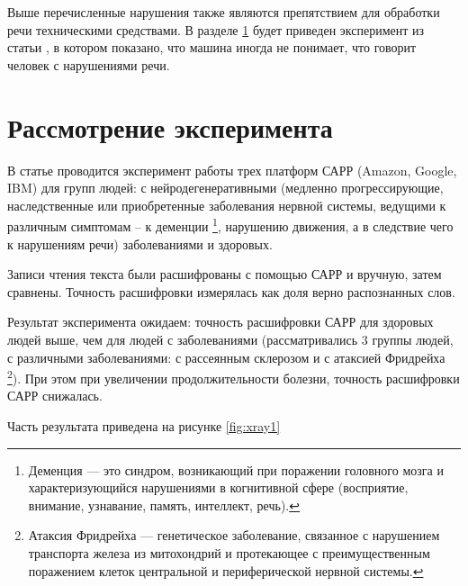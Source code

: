 Выше перечисленные нарушения также являются препятствием для обработки речи техническими средствами. В разделе \ref{5000} будет приведен эксперимент из статьи \cite{primer}, в котором показано, что машина иногда не понимает, что говорит человек с нарушениями речи.


\section{Рассмотрение эксперимента} \label{5000}
В статье \cite{primer} проводится эксперимент работы трех платформ САРР \newline(Amazon, Google, IBM) для групп людей: с нейродегенеративными (медленно прогрессирующие, наследственные или приобретенные заболевания нервной системы, ведущими к различным симптомам -- к деменции \footnote{Деменция — это синдром, возникающий при поражении головного мозга и характеризующийся нарушениями в когнитивной сфере (восприятие, внимание, узнавание, память, интеллект, речь).}, нарушению движения, а в следствие чего к нарушениям речи) заболеваниями и здоровых.

Записи чтения текста были расшифрованы с помощью САРР и вручную, затем сравнены. Точность расшифровки измерялась как доля верно распознанных слов. 

Результат эксперимента ожидаем: точность расшифровки САРР для здоровых людей выше, чем для людей с заболеваниями (рассматривались 3 группы людей, с различными заболеваниями: с рассеянным склерозом и с атаксией Фридрейха \footnote{Атаксия Фридрейха — генетическое заболевание, связанное с нарушением транспорта железа из митохондрий и протекающее с преимущественным поражением клеток центральной и периферической нервной системы.}). При этом при увеличении продолжительности болезни, точность расшифровки САРР снижалась. 

Часть результата приведена на рисунке \ref{fig:xray1}

